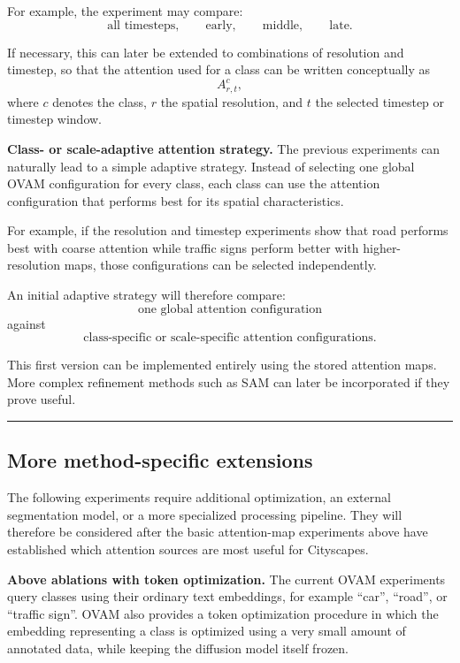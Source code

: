 \documentclass[11pt,a4paper]{article}
\begin{document}
For example, the experiment may compare:
\[
\text{all timesteps},
\qquad
\text{early},
\qquad
\text{middle},
\qquad
\text{late}.
\]

If necessary, this can later be extended to combinations of resolution and timestep,
so that the attention used for a class can be written conceptually as
\[
A^{c}_{r,t},
\]
where $c$ denotes the class, $r$ the spatial resolution, and $t$ the selected
timestep or timestep window.

\textbf{Class- or scale-adaptive attention strategy.}
The previous experiments can naturally lead to a simple adaptive strategy. Instead
of selecting one global OVAM configuration for every class, each class
can use the attention configuration that performs best for its spatial characteristics.

For example, if the resolution and timestep experiments show that road performs
best with coarse attention while traffic signs perform better with higher-resolution
maps, those configurations can be selected independently.

An initial adaptive strategy will therefore compare:
\[
\text{one global attention configuration}
\]
against
\[
\text{class-specific or scale-specific attention configurations}.
\]

This first version can be implemented entirely using the stored attention maps.
More complex refinement methods such as SAM can later be incorporated if they
prove useful.

\vspace{0.5em}
\hrule
\vspace{0.8em}

\subsection*{More method-specific extensions}

The following experiments require additional optimization, an external segmentation
model, or a more specialized processing pipeline. They will therefore be considered
after the basic attention-map experiments above have established which attention
sources are most useful for Cityscapes.

\textbf{Above ablations with token optimization.}
The current OVAM experiments query classes using their ordinary text embeddings,
for example ``car'', ``road'', or ``traffic sign''. OVAM also provides a token
optimization procedure in which the embedding representing a class is optimized
using a very small amount of annotated data, while keeping the diffusion model
itself frozen.
\end{document}
